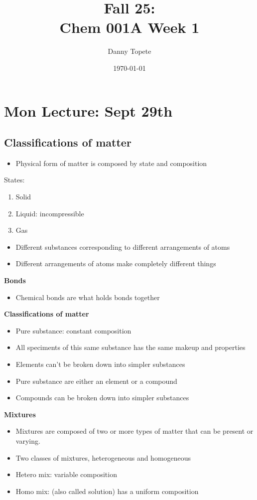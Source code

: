 \documentclass{article}
\title{Fall 25: \\Chem 001A Week 1}
\author{Danny Topete}
\date{\today}
\begin{document}
\maketitle

\section{Mon Lecture: Sept 29th}

\subsection{Classifications of matter}
\begin{itemize}
  \item Physical form of matter is composed by state and composition
\end{itemize}

States:
\begin{enumerate}
  \item Solid
  \item Liquid: incompressible
  \item Gas
\end{enumerate}

\begin{itemize}
  \item Different substances corresponding to different arrangements of atoms
  \item Different arrangements of atoms make completely different things
\end{itemize}

\bf{Bonds}
\begin{itemize}
  \item Chemical bonds are what holds bonds together
\end{itemize}

\bf{Classifications of matter}
\begin{itemize}
  \item Pure substance: constant composition
  \item All speciments of this same substance has the same makeup and properties
  \item Elements can't be broken down into simpler substances
  \item Pure substance are either an element or a compound
  \item Compounds can be broken down into simpler substances
\end{itemize}

\bf{Mixtures}
\begin{itemize}
  \item Mixtures are composed of two or more types of matter that can be present or varying.
  \item Two classes of mixtures, heterogeneous and homogeneous
  \item Hetero mix: variable composition
  \item Homo mix: (also called solution) has a uniform composition
\end{itemize}
\end{document}
